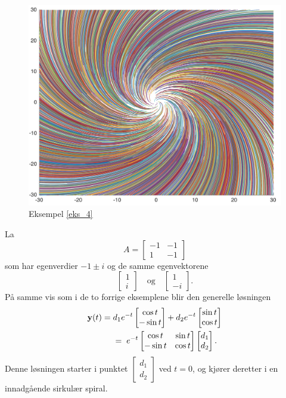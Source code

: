 \begin{figure}[htbp]
  \begin{center}
	\includegraphics[scale=.1]{eks_4.jpg}
	\captionsetup{labelformat=empty}
	\caption{Eksempel \ref{eks_4}}
	\end{center}
\end{figure}



\begin{ex}
\label{eks_5}
La 
\[
A=
\begin{bmatrix}
-1 & -1   \\
1 & -1
\end{bmatrix}
\]
som har egenverdier $-1\pm i$ og de samme egenvektorene
\[
\begin{bmatrix}
1  \\
i 
\end{bmatrix}
\quad \text{og} \quad
\begin{bmatrix}
1  \\
-i 
\end{bmatrix}. 
\]
På samme vis som i de to forrige eksemplene blir den generelle løsningen 
\begin{align*}
\mathbf{y}(t)=\;&d_1e^{-t}\begin{bmatrix} \cos t \\ -\sin t\end{bmatrix}+d_2e^{-t}\begin{bmatrix}  \sin t \\ \cos t\end{bmatrix}\\&=\;e^{-t}\begin{bmatrix} \cos t & \sin t\\ -\sin t & \cos t\end{bmatrix}\begin{bmatrix} d_1 \\ d_2 \end{bmatrix}.
\end{align*}
Denne løsningen starter i punktet $\begin{bmatrix} d_1 \\ d_2 \end{bmatrix}$ ved $t=0$, og kjører deretter i en innadgående sirkulær spiral.
\end{ex}


